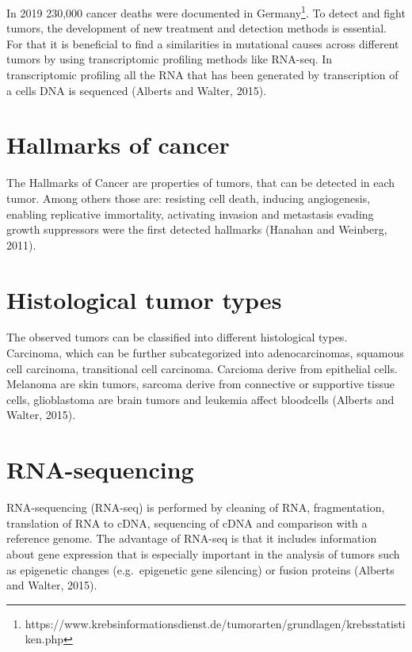\documentclass[
  parskip,
  oneside]{scrreprt}
\begin{document}
In 2019 230,000 cancer deaths were documented in
Germany\footnote{ https://www.krebsinformationsdienst.de/tumorarten/grundlagen/krebsstatistiken.php}.
To detect and fight tumors, the development of new treatment and
detection methods is essential. For that it is beneficial to find a
similarities in mutational causes across different tumors by using
transcriptomic profiling methods like RNA-seq. In transcriptomic
profiling all the RNA that has been generated by transcription of a
cells DNA is sequenced (Alberts and Walter, 2015).

\hypertarget{hallmarks-of-cancer}{%
\section{Hallmarks of cancer}\label{hallmarks-of-cancer}}

The Hallmarks of Cancer are properties of tumors, that can be detected
in each tumor. Among others those are: resisting cell death, inducing
angiogenesis, enabling replicative immortality, activating invasion and
metastasis evading growth suppressors were the first detected hallmarks
(Hanahan and Weinberg, 2011).

\hypertarget{histological-tumor-types}{%
\section{Histological tumor types}\label{histological-tumor-types}}

The observed tumors can be classified into different histological types.
Carcinoma, which can be further subcategorized into adenocarcinomas,
squamous cell carcinoma, transitional cell carcinoma. Carcioma derive
from epithelial cells. Melanoma are skin tumors, sarcoma derive from
connective or supportive tissue cells, glioblastoma are brain tumors and
leukemia affect bloodcells (Alberts and Walter, 2015).

\hypertarget{rna-sequencing}{%
\section{RNA-sequencing}\label{rna-sequencing}}

RNA-sequencing (RNA-seq) is performed by cleaning of RNA, fragmentation,
translation of RNA to cDNA, sequencing of cDNA and comparison with a
reference genome. The advantage of RNA-seq is that it includes
information about gene expression that is especially important in the
analysis of tumors such as epigenetic changes (e.g.~epigenetic gene
silencing) or fusion proteins (Alberts and Walter, 2015).
\end{document}
